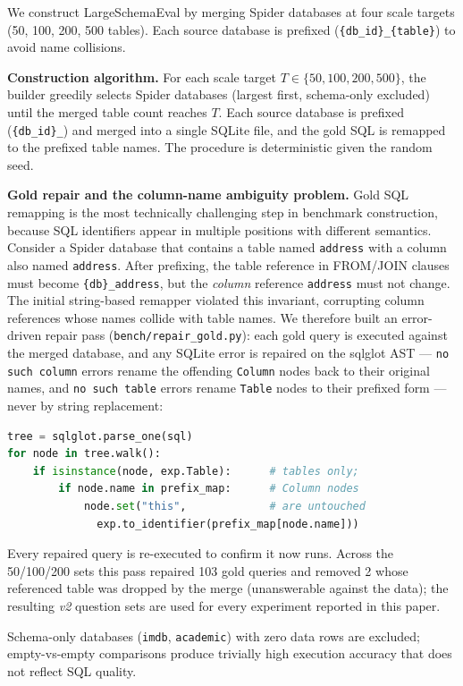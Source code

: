 \documentclass[conference]{IEEEtran}
\begin{document}
We construct LargeSchemaEval by merging Spider databases at four
scale targets (50, 100, 200, 500 tables). Each source database is
prefixed (\texttt{\{db\_id\}\_\{table\}}) to avoid name collisions.

\textbf{Construction algorithm.}
For each scale target $T \in \{50, 100, 200, 500\}$, the builder greedily
selects Spider databases (largest first, schema-only excluded) until
the merged table count reaches $T$. Each source database is prefixed
(\texttt{\{db\_id\}\_}) and merged into a single SQLite file, and the
gold SQL is remapped to the prefixed table names. The procedure is
deterministic given the random seed.

\textbf{Gold repair and the column-name ambiguity problem.}
Gold SQL remapping is the most technically challenging step in benchmark
construction, because SQL identifiers appear in multiple positions with
different semantics. Consider a Spider database that contains a table
named \texttt{address} with a column also named \texttt{address}. After
prefixing, the table reference in FROM/JOIN clauses must become
\texttt{\{db\}\_address}, but the \emph{column} reference
\texttt{address} must not change. The initial string-based remapper
violated this invariant, corrupting column references whose names
collide with table names. We therefore built an error-driven repair
pass (\texttt{bench/repair\_gold.py}): each gold query is executed
against the merged database, and any SQLite error is repaired on the
sqlglot AST --- \texttt{no such column} errors rename the offending
\texttt{Column} nodes back to their original names, and \texttt{no such
table} errors rename \texttt{Table} nodes to their prefixed form ---
never by string replacement:
\begin{lstlisting}[language=Python,basicstyle=\scriptsize\ttfamily]
tree = sqlglot.parse_one(sql)
for node in tree.walk():
    if isinstance(node, exp.Table):      # tables only;
        if node.name in prefix_map:      # Column nodes
            node.set("this",             # are untouched
              exp.to_identifier(prefix_map[node.name]))
\end{lstlisting}
Every repaired query is re-executed to confirm it now runs. Across the
50/100/200 sets this pass repaired 103 gold queries and removed 2 whose
referenced table was dropped by the merge (unanswerable against the
data); the resulting \emph{v2} question sets are used for every
experiment reported in this paper.

Schema-only databases (\texttt{imdb}, \texttt{academic}) with zero data
rows are excluded; empty-vs-empty comparisons produce trivially high
execution accuracy that does not reflect SQL quality.
\end{document}
